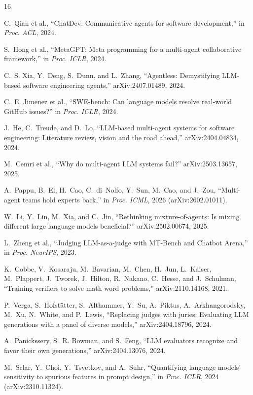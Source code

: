\documentclass[conference]{IEEEtran}
\begin{document}
\begin{thebibliography}{16}

C.~Qian et al., ``ChatDev: Communicative agents for software development,''
in \emph{Proc. ACL}, 2024.

S.~Hong et al., ``MetaGPT: Meta programming for a multi-agent collaborative
framework,'' in \emph{Proc. ICLR}, 2024.

C.~S. Xia, Y.~Deng, S.~Dunn, and L.~Zhang, ``Agentless: Demystifying
LLM-based software engineering agents,'' arXiv:2407.01489, 2024.

C.~E. Jimenez et al., ``SWE-bench: Can language models resolve real-world
GitHub issues?'' in \emph{Proc. ICLR}, 2024.

J.~He, C.~Treude, and D.~Lo, ``LLM-based multi-agent systems for software
engineering: Literature review, vision and the road ahead,''
arXiv:2404.04834, 2024.

M.~Cemri et al., ``Why do multi-agent LLM systems fail?'' arXiv:2503.13657,
2025.

A.~Pappu, B.~El, H.~Cao, C.~di~Nolfo, Y.~Sun, M.~Cao, and J.~Zou,
``Multi-agent teams hold experts back,'' in \emph{Proc. ICML}, 2026
(arXiv:2602.01011).

W.~Li, Y.~Lin, M.~Xia, and C.~Jin, ``Rethinking mixture-of-agents: Is
mixing different large language models beneficial?'' arXiv:2502.00674,
2025.

L.~Zheng et al., ``Judging LLM-as-a-judge with MT-Bench and Chatbot Arena,''
in \emph{Proc. NeurIPS}, 2023.

K.~Cobbe, V.~Kosaraju, M.~Bavarian, M.~Chen, H.~Jun, L.~Kaiser, M.~Plappert,
J.~Tworek, J.~Hilton, R.~Nakano, C.~Hesse, and J.~Schulman, ``Training
verifiers to solve math word problems,'' arXiv:2110.14168, 2021.

P.~Verga, S.~Hofst\"atter, S.~Althammer, Y.~Su, A.~Piktus, A.~Arkhangorodsky,
M.~Xu, N.~White, and P.~Lewis, ``Replacing judges with juries: Evaluating LLM
generations with a panel of diverse models,'' arXiv:2404.18796, 2024.

A.~Panickssery, S.~R. Bowman, and S.~Feng, ``LLM evaluators recognize and
favor their own generations,'' arXiv:2404.13076, 2024.

M.~Sclar, Y.~Choi, Y.~Tsvetkov, and A.~Suhr, ``Quantifying language models'
sensitivity to spurious features in prompt design,'' in \emph{Proc. ICLR},
2024 (arXiv:2310.11324).


\end{thebibliography}
\end{document}
